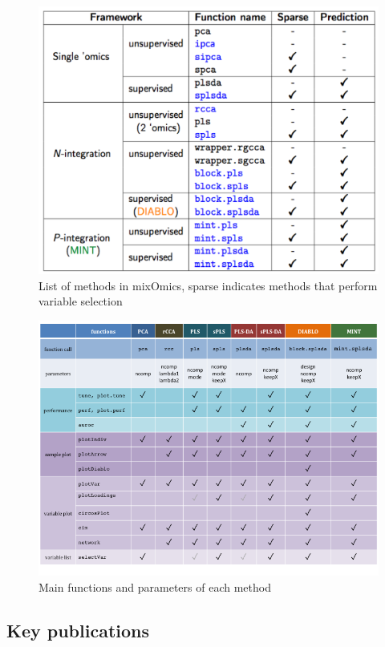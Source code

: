 \documentclass[]{book}
\theoremstyle{definition}
\theoremstyle{definition}
\theoremstyle{definition}
\theoremstyle{remark}
\begin{document}
\begin{figure}

{\centering \includegraphics[width=0.6\linewidth]{XtraFigs/Methods} 

}

\caption{List of methods in mixOmics, sparse indicates methods that perform variable selection}\label{fig:methods}
\end{figure}

\begin{figure}

{\centering \includegraphics[width=1\linewidth]{XtraFigs/cheatsheet} 

}

\caption{Main functions and parameters of each method}\label{fig:cheatsheet}
\end{figure}

\subsection{Key publications}\label{intro:pubs}
\end{document}
